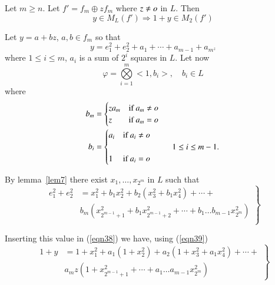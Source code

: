 \begin{lem}\label{lem8}
Let $m\geq n$. Let $f'=f_m\oplus zf_m$ where $z\neq o$ in $L$. Then 
$$
y\in M_L(f')\Rightarrow 1+y \in M_2(f')
$$
\end{lem}

\begin{Proof}
Let $y=a+bz$, $a,b\in f_m$ so that 
\begin{equation}\label{eqn38}
y=e^{2}_1+e^{2}_2+a_1+\cdots+a_{m-1}+a_{m^{z}}
\end{equation}
where $1\leq i\leq m$, $a_i$ is a sum of $2^{i}$ squares in $L$. Let
now 
$$
\varphi=\bigotimes\limits_{i=1}^{m}<1,b_i>,\quad b_i\in L
$$
where
\begin{equation}\label{eqn39}
\begin{aligned}
b_m &=
\begin{cases}
za_m & \text{if } a_m\neq o\\
z & \text{if } a_m=o
\end{cases}\\
b_i&=
\begin{cases}
a_i & \text{if } a_i\neq o \\
& \qquad\qquad\qquad 1\leq i \leq m-1.\\
1 & \text{if } a_i=o 
\end{cases}
\end{aligned}
\end{equation}

By lemma~\ref{lem7} there exist $x_1,\ldots,x_{2^{m}}$ in $L$ such
that 
\begin{equation*}
\left.\begin{aligned}
e^{2}_1+e^{2}_2&=x^{2}_1+b_1x^{2}_2+b_2\left(x^{2}_3+b_1x^{2}_4\right)+\cdots+\\
                 &
b_m\left(x^{2}_{2^{m-1}+1}+b_1x^{2}_{2^{m-1}+2}+\cdots+ b_1\ldots b_{m-1}x^{2}_{2^{m}}\right)\\
\end{aligned}\right\}
\end{equation*}

Inserting this value in (\ref{eqn38}) we have, using (\ref{eqn39})
\begin{equation}\label{eqn40}
\left.\begin{aligned}
1+y&=
1+x^{2}_1+a_1\left(1+x^{2}_2\right)+a_2\left(1+x^{2}_3+a_1x^{2}_4\right)+\cdots+\\
&a_mz\left(1+x^{2}_{2^{m-1}+1}+\cdots+a_1\ldots a_{m-1} x^{2}_{2^{m}}\right)
\end{aligned}\right\}
\end{equation}


\end{Proof}
